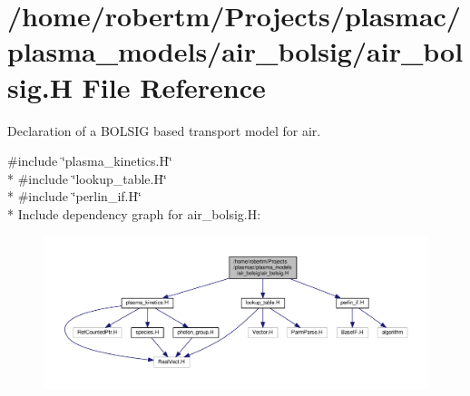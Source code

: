 \hypertarget{air__bolsig_8H}{}\section{/home/robertm/\+Projects/plasmac/plasma\+\_\+models/air\+\_\+bolsig/air\+\_\+bolsig.H File Reference}
\label{air__bolsig_8H}


Declaration of a B\+O\+L\+S\+IG based transport model for air.  


{\ttfamily \#include \char`\"{}plasma\+\_\+kinetics.\+H\char`\"{}}\\*
{\ttfamily \#include \char`\"{}lookup\+\_\+table.\+H\char`\"{}}\\*
{\ttfamily \#include \char`\"{}perlin\+\_\+if.\+H\char`\"{}}\\*
Include dependency graph for air\+\_\+bolsig.\+H\+:\nopagebreak
\begin{figure}[H]
\begin{center}
\leavevmode
\includegraphics[width=350pt]{air__bolsig_8H__incl}
\end{center}
\end{figure}
